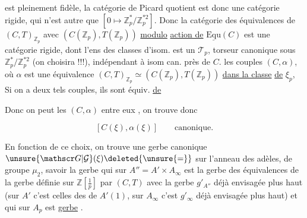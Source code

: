 est pleinement fidèle, la catégorie de Picard quotient est
donc une catégorie rigide, qui n'est autre que
$[0\mapsto\mathbb Z_p^*/\mathbb Z_p^{*2}]$. Donc la catégorie des équivalences de
$(C,T)_{\mathbb Z_p}$ avec $(C(\mathbb Z_p),T(\mathbb Z_p))$ \deleted{\unsure{$\to$}} \uline{modulo} \uline{action de} $\underline{\mathrm{Equ}}(C)$
est une catégorie rigide,  dont l'ens des
classes d'isom. est un $\mathcal T_p$, torseur canonique sous
$\mathbb Z_p^*/\mathbb Z_p^{*2}$ (on choisira !!!), indépendant à isom
can. près de $C$.  
 les
couples $(C,\alpha)$, où  $\alpha$ est une équivalence
$(C,T)_{\mathbb Z_p}\simeq(C(\mathbb Z_p),T(\mathbb Z_p))$ \uline{dans la classe} \uline{de} $\xi_p$, 
 Si on a deux tels couples, ils sont
 équiv. \uline{de} 


Donc on peut   les $(C,\alpha)$  entre
eux , on trouve donc

\[
[C(\xi),\alpha(\xi)]\qquad\text{canonique.}
\]


En fonction de ce choix, on trouve une gerbe
canonique $\unsure{\mathscr G|\mathcal G}(\xi)\deleted{\unsure{=}}$ sur l'anneau des adèles,
de groupe $\mu_2$, savoir la gerbe qui sur $A''=A'\times A_\infty$ est
la gerbe des équivalences  de la gerbe  
définie sur $\mathbb Z[\frac1p]$ par $(C,T)$  avec la gerbe
$g'_{A''}$ déjà envisagée plus haut (sur $A'$ c'est celles
des \unsure{$\sqrt{\ }$} de $A'(1)$, sur $A_\infty$ c'est $g'_\infty$ déjà envisagée
plus haut) et qui sur $A_p$ est  \uline{gerbe} .

